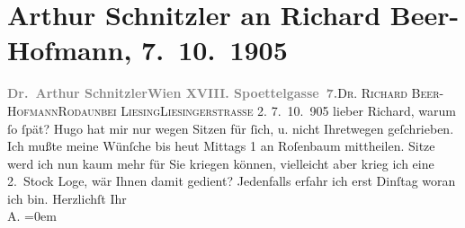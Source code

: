 

         
         \renewcommand{\erwaehntePersonen}{Personen: Richard Beer-Hofmann, Hugo von Hofmannsthal, Richard Rosenbaum}
         \renewcommand{\erwaehnteOrte}{Orte: Edmund-Weiß-Gasse, Liesingerstraße, Rodaun, Wien, XVIII., Währing, XXIII., Liesing}
         \renewcommand{\erwaehnteWerke}{}
               \section[Arthur Schnitzler an Richard Beer-Hofmann, 7. 10. 1905]{ Arthur Schnitzler an Richard Beer-Hofmann, 7. 10. 1905}\nopagebreak{}\rehead{ }\begin{ledgroupsized}[t]{13cm}\normalsize\beginnumbering \toendnotes[C]{\smallbreak\pagebreak[2]} 
\pstart{}{\pb}\textcolor{gray}{\textbf{Dr. Arthur Schnitzler}}\pend{}\pstart{}\textcolor{gray}{\textbf{Wien XVIII. Spoettelgasse 7.}}\pend{}{\bigskip}\pstart{}{\pb}\textsc{Dr. Richard Beer-Hofmann}\pend{}\pstart{}\textsc{Rodaun}\pend{}\pstart{}\textsc{bei Liesing}\pend{}\pstart{}\textsc{Liesingerstraße} 2.\pend{}{\bigskip}\pstart
           \raggedleft{}{\pb}7. 10. 905\pend
           \pstart
           lieber Richard, warum ſo ſpät? Hugo hat mir nur wegen Sitzen für ſich, u. nicht Ihretwegen geſchrieben. Ich
               mußte meine Wünſche bis heut Mittags 1 an Roſenbaum mittheilen. Sitze werd {\pb}ich \introOben{}nun\introOben{} kaum \introOben{}mehr\introOben{} für Sie kriegen können, vielleicht aber krieg ich eine
               2. Stock Loge, wär Ihnen damit gedient? Jedenfalls erfahr ich erst
                  Dinſtag woran ich bin.\pend
           \pstart
           Herzlichſt Ihr{\\[\baselineskip]}\spacefill\mbox{A.}\pend
           \leftskip=0em{}
         
         \endnumbering{}\end{ledgroupsized}  \newcommand{\dateiname}{L01559}\newcommand{\titel}{Arthur Schnitzler an Richard Beer-Hofmann, 7. 10. 1905}\newcommand{\editorInnen}{Martin Anton Müller und Gerd-Hermann Susen}
      